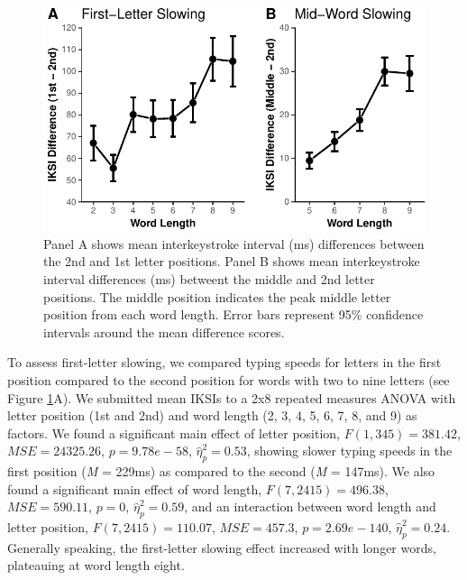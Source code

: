 \documentclass[,man,floatsintext]{apa6}
\begin{document}
\begin{figure}
\centering
\includegraphics{v2-manuscript_files/figure-latex/figure2-1.pdf}
\caption{\label{fig:figure2}Panel A shows mean interkeystroke interval (ms) differences between the 2nd and 1st letter positions. Panel B shows mean interkeystroke interval differences (ms) betweent the middle and 2nd letter positions. The middle position indicates the peak middle letter position from each word length. Error bars represent 95\% confidence intervals around the mean difference scores.}
\end{figure}



To assess first-letter slowing, we compared typing speeds for letters in the first position compared to the second position for words with two to nine letters (see Figure \ref{fig:figure2}A). We submitted mean IKSIs to a 2x8 repeated measures ANOVA with letter position (1st and 2nd) and word length (2, 3, 4, 5, 6, 7, 8, and 9) as factors. We found a significant main effect of letter position, \(F(1, 345) = 381.42\), \(\mathit{MSE} = 24325.26\), \(p = 9.78e-58\), \(\hat{\eta}^2_\textit{p} = 0.53\), showing slower typing speeds in the first position (\textit{M} = 229ms) as compared to the second (\textit{M} = 147ms). We also found a significant main effect of word length, \(F(7, 2415) = 496.38\), \(\mathit{MSE} = 590.11\), \(p = 0\), \(\hat{\eta}^2_\textit{p} = 0.59\), and an interaction between word length and letter position, \(F(7, 2415) = 110.07\), \(\mathit{MSE} = 457.3\), \(p = 2.69e-140\), \(\hat{\eta}^2_\textit{p} = 0.24\). Generally speaking, the first-letter slowing effect increased with longer words, plateauing at word length eight.
\end{document}
